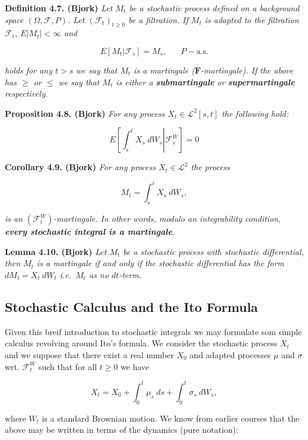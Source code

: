 \documentclass[
]{book}
\begin{document}
\textbf{Definition 4.7. (Bjork)} \emph{Let \(M_t\) be a stochastic process defined on a background space \((\Omega,\mathcal{F},P)\). Let \((\mathcal{F}_t)_{t\ge 0}\) be a filtration. If \(M_t\) is adapted to the filtration \(\mathcal{F}_t\), \(E\vert M_t\vert <\infty\) and}

\[E[M_t\vert \mathcal{F}_s]=M_s,\hspace{20pt}P-\text{a.s.}\]

\emph{holds for any \(t>s\) we say that \(M_t\) is a martingale (\(\mathbf{F}\)-martingale). If the above has \(\ge\) or \(\le\) we say that \(M_t\) is either a \textbf{submartingale} or \textbf{supermartingale} respectively.}

\textbf{Proposition 4.8. (Bjork)} \emph{For any process \(X_t\in\mathcal{L}^2[s,t]\) the following hold:}

\[
E\left[\left.\int_s^t X_s\ dW_s\right\vert\mathcal{F}_s^W\right]=0
\]

\textbf{Corollary 4.9. (Bjork)} \emph{For any process \(X_t\in\mathcal{L}^2\) the process}

\[
M_t=\int_s^t X_s\ dW_s,
\]

\emph{is an \((\mathcal{F}_t^W)\)-martingale. In other words, modulo an integrability condition, \textbf{every stochastic integral is a martingale}.}

\textbf{Lemma 4.10. (Bjork)} \emph{Let \(M_t\) be a stochastic process with stochastic differential, then \(M_t\) is a martingale if and only if the stochastic differential has the form \(dM_t=X_t\ dW_t\) i.e.~\(M_t\) as no \(dt\)-term.}

\hypertarget{stochastic-calculus-and-the-ito-formula}{%
\subsection{Stochastic Calculus and the Ito Formula}\label{stochastic-calculus-and-the-ito-formula}}

Given this breif introduction to stochastic integrals we may formulate som simple calculus revolving around Ito's formula. We consider the stochastic process \(X_t\) and we suppose that there exist a real number \(X_0\) and adapted processes \(\mu\) and \(\sigma\) wrt. \(\mathcal{F}_t^W\) such that for all \(t\ge0\) we have

\[
X_t=X_0+\int_0^t\mu_s\ ds+\int_0^t\sigma_s\ dW_s,\tag{4.16}
\]

where \(W_t\) is a standard Brownian motion. We know from earlier courses that the above may be written in terms of the dynamics (pure notation):
\end{document}
